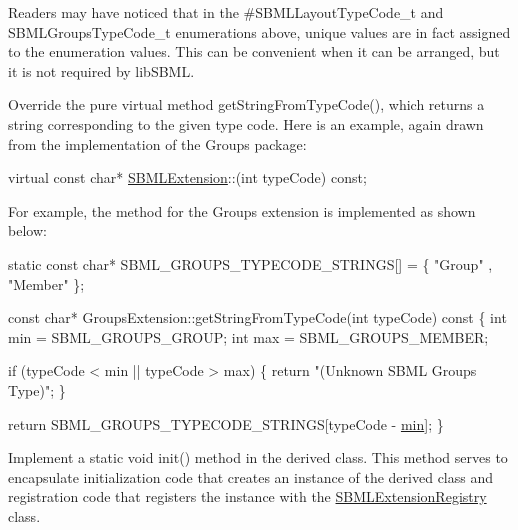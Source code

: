 Readers may have noticed that in the \#\+S\+B\+M\+L\+Layout\+Type\+Code\+\_\+t and {\ttfamily S\+B\+M\+L\+Groups\+Type\+Code\+\_\+t} enumerations above, unique values are in fact assigned to the enumeration values. This can be convenient when it can be arranged, but it is not required by lib\+S\+B\+ML.

Override the pure virtual method {\ttfamily get\+String\+From\+Type\+Code()}, which returns a string corresponding to the given type code. Here is an example, again drawn from the implementation of the Groups package\+: 
\begin{DoxyCode}
\textcolor{keyword}{virtual} \textcolor{keyword}{const} \textcolor{keywordtype}{char}* \hyperlink{class_s_b_m_l_extension}{SBMLExtension}::(\textcolor{keywordtype}{int} typeCode) \textcolor{keyword}{const};
\end{DoxyCode}


For example, the method for the Groups extension is implemented as shown below\+: 
\begin{DoxyCode}
\textcolor{keyword}{static} \textcolor{keyword}{const} \textcolor{keywordtype}{char}* SBML\_GROUPS\_TYPECODE\_STRINGS[] =
\{
    \textcolor{stringliteral}{"Group"}
  , \textcolor{stringliteral}{"Member"}
\};

\textcolor{keyword}{const} \textcolor{keywordtype}{char}* GroupsExtension::getStringFromTypeCode(\textcolor{keywordtype}{int} typeCode)\textcolor{keyword}{ const}
\textcolor{keyword}{}\{
  \textcolor{keywordtype}{int} min = SBML\_GROUPS\_GROUP;
  \textcolor{keywordtype}{int} max = SBML\_GROUPS\_MEMBER;

  \textcolor{keywordflow}{if} (typeCode < min || typeCode > max)
  \{
    \textcolor{keywordflow}{return} \textcolor{stringliteral}{"(Unknown SBML Groups Type)"};
  \}

  \textcolor{keywordflow}{return} SBML\_GROUPS\_TYPECODE\_STRINGS[typeCode - \hyperlink{dependencies_2third-party_2clapack_23_82_81_2_f2_c_l_i_b_s_2libf2c_2f2c_8h_ac6afabdc09a49a433ee19d8a9486056d}{min}];
\}
\end{DoxyCode}


Implement a {\ttfamily static void init()} method in the derived class. This method serves to encapsulate initialization code that creates an instance of the derived class and registration code that registers the instance with the \hyperlink{class_s_b_m_l_extension_registry}{S\+B\+M\+L\+Extension\+Registry} class.

